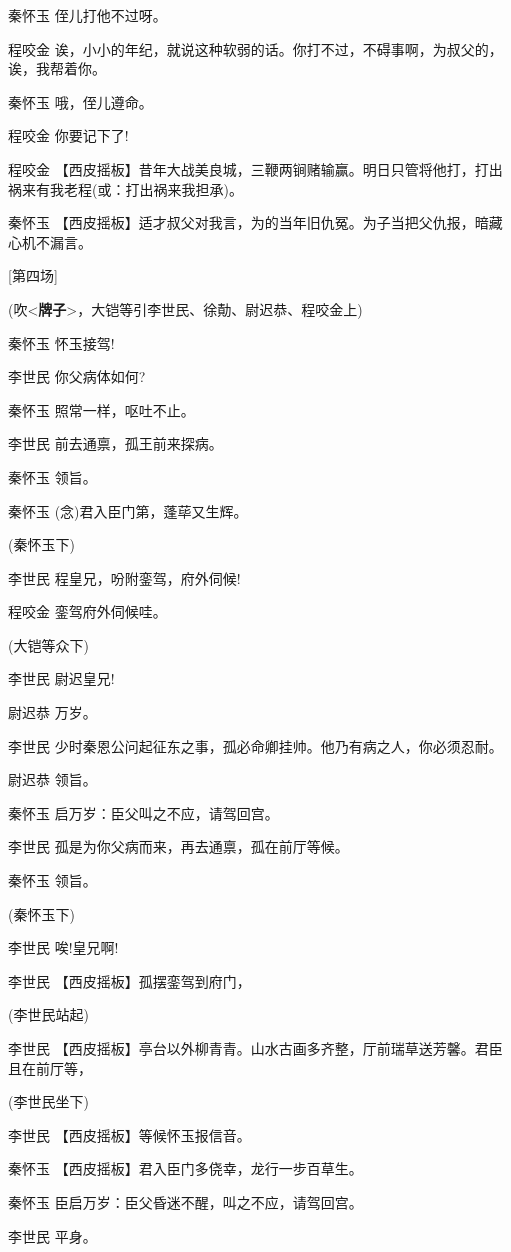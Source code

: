 秦怀玉 侄儿打他不过呀。

程咬金
诶，小小的年纪，就说这种软弱的话。你打不过，不碍事啊，为叔父的，诶，我帮着你。

秦怀玉 哦，侄儿遵命。

程咬金 你要记下了!

程咬金
【西皮摇板】昔年大战美良城，三鞭两锏赌输赢。明日只管将他打，打出祸来有我老程(或：打出祸来我担承)。

秦怀玉
【西皮摇板】适才叔父对我言，为的当年旧仇冤。为子当把父仇报，暗藏心机不漏言。

{[}第四场{]}

(吹\textless{}\textbf{牌子}\textgreater{}，大铠等引李世民、徐勣、尉迟恭、程咬金上)

秦怀玉 怀玉接驾!

李世民 你父病体如何?

秦怀玉 照常一样，呕吐不止。

李世民 前去通禀，孤王前来探病。

秦怀玉 领旨。

秦怀玉 (念)君入臣门第，蓬荜又生辉。

(秦怀玉下)

李世民 程皇兄，吩附銮驾，府外伺候!

程咬金 銮驾府外伺候哇。

(大铠等众下)

李世民 尉迟皇兄!

尉迟恭 万岁。

李世民 少时秦恩公问起征东之事，孤必命卿挂帅。他乃有病之人，你必须忍耐。

尉迟恭 领旨。

秦怀玉 启万岁：臣父叫之不应，请驾回宫。

李世民 孤是为你父病而来，再去通禀，孤在前厅等候。

秦怀玉 领旨。

(秦怀玉下)

李世民 唉!皇兄啊!

李世民 【西皮摇板】孤摆銮驾到府门，

(李世民站起)

李世民
【西皮摇板】亭台以外柳青青。山水古画多齐整，厅前瑞草送芳馨。君臣且在前厅等，

(李世民坐下)

李世民 【西皮摇板】等候怀玉报信音。

秦怀玉 【西皮摇板】君入臣门多侥幸，龙行一步百草生。

秦怀玉 臣启万岁：臣父昏迷不醒，叫之不应，请驾回宫。

李世民 平身。

